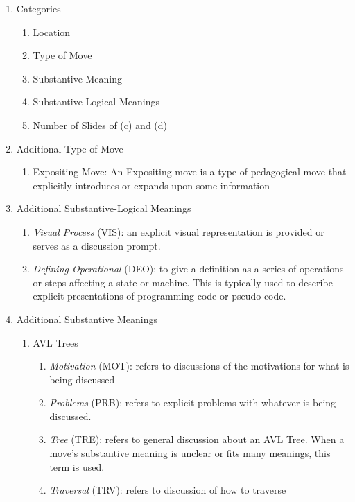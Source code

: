 \documentclass[conference]{IEEEtran}
\begin{document}
\begin{enumerate}[M1.]
  \item{Categories} 
    \begin{enumerate}
      \item Location
      \item Type of Move
      \item Substantive Meaning
      \item Substantive-Logical Meanings
      \item Number of Slides of (c) and (d)
    \end{enumerate}
  \item{Additional Type of Move}
    \begin{enumerate}
      \item{Expositing Move:} An Expositing move is a type of pedagogical move
        that explicitly introduces or expands upon some information
    \end{enumerate}
  \item{Additional Substantive-Logical Meanings}
    \begin{enumerate}
      \item \emph{Visual Process} (VIS): an explicit visual representation is
        provided or serves as a discussion prompt.
      \item \emph{Defining-Operational} (DEO): to give a definition as a series
        of operations or steps affecting a state or machine. This is typically
        used to describe explicit presentations of programming code or pseudo-code.
    \end{enumerate}
  \item{Additional Substantive Meanings}
    \begin{enumerate}
      \item{AVL Trees}
        \begin{enumerate}
          \item \emph{Motivation} (MOT): refers to discussions of the motivations
            for what is being discussed
          \item \emph{Problems} (PRB): refers to explicit problems with whatever is
            being discussed.
          \item \emph{Tree} (TRE): refers to general discussion about an AVL
            Tree. When a move's substantive meaning is unclear or fits many
            meanings, this term is used.
          \item \emph{Traversal} (TRV): refers to discussion of how to traverse

\end{enumerate}
\end{enumerate}
\end{enumerate}
\end{document}

